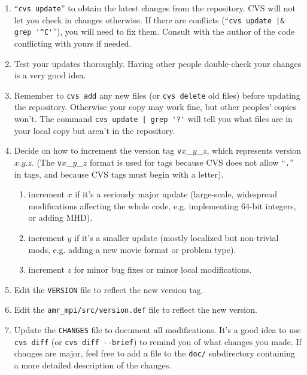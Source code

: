 \documentclass{article}
\begin{document}
\begin{enumerate}
   \item ``\verb+cvs update+'' to obtain the latest changes from the repository.
      CVS will not let you check in changes otherwise.  If there are
      conflicts (``\verb+cvs update |& grep '^C'+''), you will need to fix
      them.  Consult with the author of the code conflicting with
      yours if needed.

   \item Test your updates thoroughly.  Having other people double-check
      your changes is a very good idea.

   \item Remember to \verb+cvs add+ any new files (or \verb+cvs delete+
    old files) before updating the repository.  Otherwise your
   copy may work fine, but other peoples' copies won't.  The command
   \verb+cvs update | grep '?'+ will tell you what files are in your
   local copy but aren't in the repository.

   \item Decide on how to increment the version tag
   \texttt{v}$x$\_$y$\_$z$, which represents version $x$.$y$.$z$.  (The
   \texttt{v}$x$\_$y$\_$z$ format is used for tags because CVS does not
   allow ``\texttt{.}'' in tags, and because CVS tags must begin with a letter).

\begin{enumerate}
      \item increment $x$ if it's a seriously major update (large-scale,
          widespread modifications affecting the whole code, e.g. 
          implementing 64-bit integers, or adding MHD).
      \item increment $y$ if it's a smaller update (mostly localized but 
          non-trivial mods, e.g. adding a new movie format or problem type).
      \item increment $z$ for minor bug fixes or minor local modifications.
\end{enumerate}

   \item Edit the \texttt{VERSION} file to reflect the new version tag.

   \item Edit the \texttt{amr\_mpi/src/version.def} file to reflect the new
      version.

   \item Update the \texttt{CHANGES} file to document all modifications.
   It's a good idea to use \texttt{cvs diff} (or \verb+cvs diff --brief+) to remind you of what changes you made.  If changes are
   major, feel free to add a file to the \texttt{doc/} subdirectory
   containing a more detailed description of the changes.


\end{enumerate}
\end{document}
